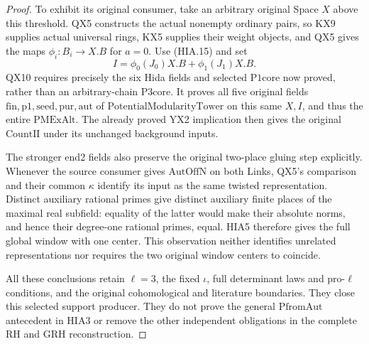 \begin{proof}
To exhibit its original consumer, take an arbitrary original
Space \(X\) above this threshold.  QX5 constructs the
actual nonempty ordinary pairs, so KX9 supplies actual
universal rings, KX5 supplies their weight objects, and
QX5 gives the maps \(\phi_i:B_i\to X.B\) for \(a=0\).
Use (HIA.15) and set
\[
                    I=\phi_0(J_0)X.B+\phi_1(J_1)X.B.
 \tag{HIA.16}
\]
QX10 requires precisely the six Hida fields and selected
\(\mathrm{P1core}\) now proved, rather than an arbitrary-chain
\(\mathrm{P3core}\).  It proves all five original fields
\(\mathrm{fin},\mathrm{p1},\mathrm{seed},\mathrm{pur},\mathrm{aut}\)
of \(\mathrm{PotentialModularityTower}\) on this same
\(X,I\), and thus the entire \(\mathrm{PMExAlt}\).
The already proved YX2 implication then gives the original
\(\mathrm{CountII}\) under its unchanged background inputs.

The stronger end2 fields also preserve the original two-place
gluing step explicitly.  Whenever the source consumer gives
\(\mathrm{AutOffN}\) on both Links, QX5's comparison and
their common \(\kappa\) identify its input as the same
twisted representation.  Distinct auxiliary rational primes
give distinct auxiliary finite places of the maximal real subfield:
equality of the latter
would make their absolute norms, and hence their degree-one
rational primes, equal.  HIA5 therefore gives the full
global window with one center.  This observation neither
identifies unrelated representations nor requires the two
original window centers to coincide.

All these conclusions retain \(\ell=3\), the fixed
\(\iota\), full determinant laws and pro-\(\ell\) conditions,
and the original cohomological and literature boundaries.
They close this selected support producer.  They do not
prove the general \(\mathrm{PfromAut}\) antecedent in
HIA3 or remove the other independent obligations in the
complete RH and GRH reconstruction.
\end{proof}
